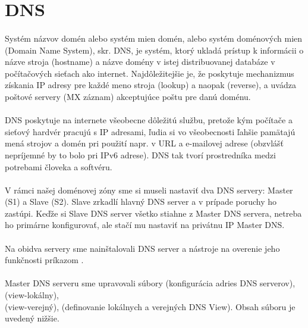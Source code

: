 \section{DNS}
\paragraph{}
Systém názvov domén alebo systém mien domén, alebo systém doménových mien (Domain Name System), skr. DNS, je systém, ktorý ukladá prístup k informácii o názve stroja (hostname) a názve domény v istej distribuovanej databáze v počítačo\-vých sieťach ako internet. Najdôležitejšie je, že poskytuje mechanizmus získania IP adresy pre každé meno stroja (lookup) a naopak (reverse), a uvádza poštové servery (MX záznam) akceptujúce poštu pre danú doménu.
\paragraph{}
DNS poskytuje na internete všeobecne dôležitú službu, pretože kým počítače a sieťový hardvér pracujú s IP adresami, ľudia si vo všeobecnosti ľahšie pamätajú mená strojov a domén pri použití napr. v URL a e-mailovej adrese (obzvlášť nepríjem\-né by to bolo pri IPv6 adrese). DNS tak tvorí prostredníka medzi potrebami človeka a softvéru.
\paragraph{}
V rámci našej doménovej zóny  sme si museli nastaviť dva DNS servery: Master (S1) a Slave (S2). Slave zrkadlí hlavný DNS server a v prípade poruchy ho zastúpi. Keďže si Slave DNS server všetko stiahne z Master DNS servera, netreba ho primárne konfigurovať, ale stačí mu  nastaviť  na privátnu IP Master DNS.
\paragraph{}
Na obidva servery sme nainštalovali DNS server a nástroje na overenie jeho funkčnosti príkazom .
\paragraph{}
Master DNS serveru sme upravovali súbory  (konfigurácia adries DNS serverov),  (view-lokálny),\\  (view-verejný),  (definovanie lokálnych a verejných DNS View). Obsah súboru  je uvedený nižšie.

